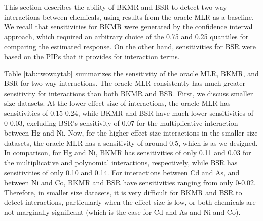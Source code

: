 \documentclass[12pt, twoside]{amherstthesis}
\begin{document}
This section describes the ability of BKMR and BSR to detect two-way interactions between chemicals, using results from the oracle MLR as a baseline. We recall that sensitivities for BKMR were generated by the confidence interval approach, which required an arbitrary choice of the 0.75 and 0.25 quantiles for comparing the estimated response. On the other hand, sensitivities for BSR were based on the PIPs that it provides for interaction terms.

Table \ref{tab:twowaytab} summarizes the sensitivity of the oracle MLR, BKMR, and BSR for two-way interactions. The oracle MLR consistently has much greater sensitivity for interactions than both BKMR and BSR. First, we discuss smaller size datasets. At the lower effect size of interactions, the oracle MLR has sensitivities of 0.15-0.24, while BKMR and BSR have much lower sensitivities of 0-0.03, excluding BSR's sensitivity of 0.07 for the multiplicative interaction between Hg and Ni. Now, for the higher effect size interactions in the smaller size datasets, the oracle MLR has a sensitivity of around 0.5, which is as we designed. In comparison, for Hg and Ni, BKMR has sensitivities of only 0.11 and 0.03 for the multiplicative and polynomial interactions, respectively, while BSR has sensitivities of only 0.10 and 0.14. For interactions between Cd and As, and between Ni and Co, BKMR and BSR have sensitivities ranging from only 0-0.02. Therefore, in smaller size datasets, it is very difficult for BKMR and BSR to detect interactions, particularly when the effect size is low, or both chemicals are not marginally significant (which is the case for Cd and As and Ni and Co).
\end{document}
